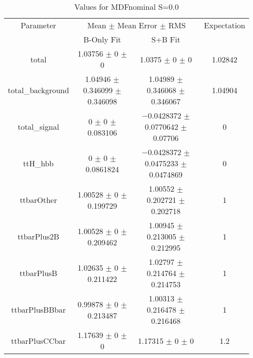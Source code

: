 \begin{table}
\centering
\caption{Values for MDFnominal S=0.0}
\begin{tabular}{cccc}
\toprule
Parameter & \multicolumn{2}{c}{Mean $\pm$ Mean Error $\pm$ RMS} & Expectation\\
 & B-Only Fit & S+B Fit & \\
\midrule
total & \num{1.03756} $\pm$ \num{0} $\pm$ \num{0} & \num{1.0375} $\pm$ \num{0} $\pm$ \num{0} & \num{1.02842}\\
total\_background & \num{1.04946} $\pm$ \num{0.346099} $\pm$ \num{0.346098} & \num{1.04989} $\pm$ \num{0.346068} $\pm$ \num{0.346067} & \num{1.04904}\\
total\_signal & \num{0} $\pm$ \num{0} $\pm$ \num{0.083106} & \num{-0.0428372} $\pm$ \num{0.0770642} $\pm$ \num{0.07706} & \num{0}\\
ttH\_hbb & \num{0} $\pm$ \num{0} $\pm$ \num{0.0861824} & \num{-0.0428372} $\pm$ \num{0.0475233} $\pm$ \num{0.0474869} & \num{0}\\
ttbarOther & \num{1.00528} $\pm$ \num{0} $\pm$ \num{0.199729} & \num{1.00552} $\pm$ \num{0.202721} $\pm$ \num{0.202718} & \num{1}\\
ttbarPlus2B & \num{1.00528} $\pm$ \num{0} $\pm$ \num{0.209462} & \num{1.00945} $\pm$ \num{0.213005} $\pm$ \num{0.212995} & \num{1}\\
ttbarPlusB & \num{1.02635} $\pm$ \num{0} $\pm$ \num{0.211422} & \num{1.02797} $\pm$ \num{0.214764} $\pm$ \num{0.214753} & \num{1}\\
ttbarPlusBBbar & \num{0.99878} $\pm$ \num{0} $\pm$ \num{0.213487} & \num{1.00313} $\pm$ \num{0.216478} $\pm$ \num{0.216468} & \num{1}\\
ttbarPlusCCbar & \num{1.17639} $\pm$ \num{0} $\pm$ \num{0} & \num{1.17315} $\pm$ \num{0} $\pm$ \num{0} & \num{1.2}\\
\bottomrule
\end{tabular}
\end{table}